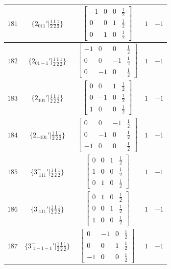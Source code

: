 \documentclass[fleqn,8pt]{jsarticle}
\begin{document}
\begin{longtable}{ccccc}
$ 181 $ & $ \{2{}_{011}{}'|\frac{1}{2} \frac{1}{2} \frac{1}{2}\} $ & $ \begin{bmatrix} -1 & 0 & 0 & \frac{1}{2} \\ 0 & 0 & 1 & \frac{1}{2} \\ 0 & 1 & 0 & \frac{1}{2} \end{bmatrix} $ & $ 1 $ & $ -1 $ \\ \hline
$ 182 $ & $ \{2{}_{01-1}{}'|\frac{1}{2} \frac{1}{2} \frac{1}{2}\} $ & $ \begin{bmatrix} -1 & 0 & 0 & \frac{1}{2} \\ 0 & 0 & -1 & \frac{1}{2} \\ 0 & -1 & 0 & \frac{1}{2} \end{bmatrix} $ & $ 1 $ & $ -1 $ \\ \hline
$ 183 $ & $ \{2{}_{101}{}'|\frac{1}{2} \frac{1}{2} \frac{1}{2}\} $ & $ \begin{bmatrix} 0 & 0 & 1 & \frac{1}{2} \\ 0 & -1 & 0 & \frac{1}{2} \\ 1 & 0 & 0 & \frac{1}{2} \end{bmatrix} $ & $ 1 $ & $ -1 $ \\ \hline
$ 184 $ & $ \{2{}_{-101}{}'|\frac{1}{2} \frac{1}{2} \frac{1}{2}\} $ & $ \begin{bmatrix} 0 & 0 & -1 & \frac{1}{2} \\ 0 & -1 & 0 & \frac{1}{2} \\ -1 & 0 & 0 & \frac{1}{2} \end{bmatrix} $ & $ 1 $ & $ -1 $ \\ \hline
$ 185 $ & $ \{3^{+}_{\,\,111}{}'|\frac{1}{2} \frac{1}{2} \frac{1}{2}\} $ & $ \begin{bmatrix} 0 & 0 & 1 & \frac{1}{2} \\ 1 & 0 & 0 & \frac{1}{2} \\ 0 & 1 & 0 & \frac{1}{2} \end{bmatrix} $ & $ 1 $ & $ -1 $ \\ \hline
$ 186 $ & $ \{3^{-}_{\,\,111}{}'|\frac{1}{2} \frac{1}{2} \frac{1}{2}\} $ & $ \begin{bmatrix} 0 & 1 & 0 & \frac{1}{2} \\ 0 & 0 & 1 & \frac{1}{2} \\ 1 & 0 & 0 & \frac{1}{2} \end{bmatrix} $ & $ 1 $ & $ -1 $ \\ \hline
$ 187 $ & $ \{3^{-}_{\,\,1-1-1}{}'|\frac{1}{2} \frac{1}{2} \frac{1}{2}\} $ & $ \begin{bmatrix} 0 & -1 & 0 & \frac{1}{2} \\ 0 & 0 & 1 & \frac{1}{2} \\ -1 & 0 & 0 & \frac{1}{2} \end{bmatrix} $ & $ 1 $ & $ -1 $ \\ \hline

\end{longtable}
\end{document}
